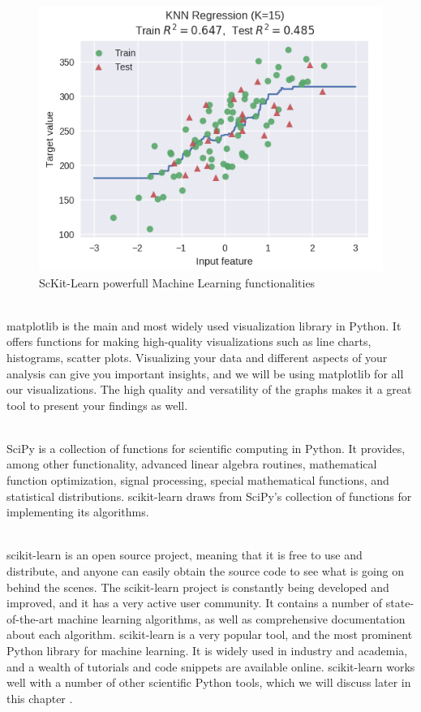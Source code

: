 \documentclass{tufte-handout}
\begin{document}
\begin{figure}[h]%
  \includegraphics[width=\linewidth]{sclearn.png}
  \caption{ScKit-Learn powerfull Machine Learning functionalities}
  \label{fig:packages}
\end{figure}
\\matplotlib is the main and most widely used visualization library in Python. It offers functions for making high-quality visualizations such as line charts, histograms, scatter plots. Visualizing your data and different aspects of your analysis can give you important insights, and we will be using matplotlib for all our visualizations. The high quality and versatility of the graphs makes it a great tool to present your findings as well.


\\SciPy is a collection of functions for scientific computing in Python. It provides, among other functionality, advanced linear algebra routines, mathematical function optimization, signal processing, special mathematical functions, and statistical distributions. scikit-learn draws from SciPy’s collection of functions for implementing its algorithms.


\\scikit-learn is an open source project, meaning that it is free to use and distribute, and anyone can easily obtain the source code to see what is going on behind the scenes. The scikit-learn project is constantly being developed and improved, and it has a very active user community. It contains a number of state-of-the-art machine learning algorithms, as well as comprehensive documentation about each algorithm. scikit-learn is a very popular tool, and the most prominent Python library for machine learning. It is widely used in industry and academia, and a wealth of tutorials and code snippets are available online. scikit-learn works well with a number of other scientific Python tools, which we will discuss later in this chapter \cite{Muller2017}.
\end{document}

